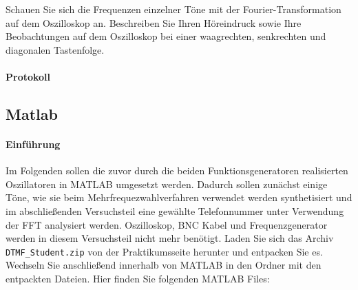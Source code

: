 \documentclass[10pt]{report}
\begin{document}
        Schauen Sie sich die Frequenzen einzelner Töne mit der Fourier-Transformation auf dem
        Oszilloskop an. Beschreiben Sie Ihren Höreindruck sowie Ihre Beobachtungen auf dem
        Oszilloskop bei einer waagrechten, senkrechten und diagonalen Tastenfolge.
        \paragraph{Protokoll}

        \subsection{Matlab}
        \paragraph{Einführung}
        Im Folgenden sollen die zuvor durch die beiden Funktionsgeneratoren realisierten Oszillatoren
        in MATLAB umgesetzt werden. Dadurch sollen zunächst einige Töne, wie sie
        beim Mehrfrequezwahlverfahren verwendet werden synthetisiert und im abschließenden
        Versuchsteil eine \glqq{}gewählte\grqq{} Telefonnummer unter Verwendung der FFT analysiert werden.
        Oszilloskop, BNC Kabel und Frequenzgenerator werden in diesem Versuchsteil nicht
        mehr benötigt.
        Laden Sie sich das Archiv \texttt{DTMF\_Student.zip} von der Praktikumsseite herunter und
        entpacken Sie es. Wechseln Sie anschließend innerhalb von MATLAB in den Ordner mit
        den entpackten Dateien. Hier finden Sie folgenden MATLAB Files:
\end{document}
